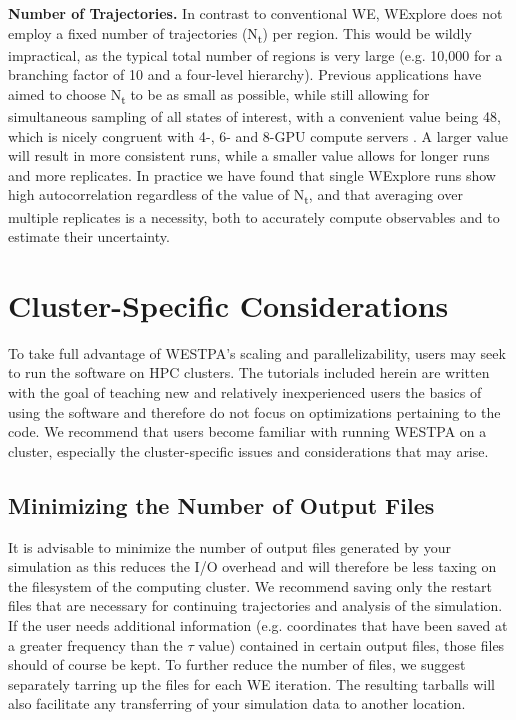 \documentclass[9pt,tutorial,ASAPversion]{livecoms}
\begin{document}
\textbf{Number of Trajectories.} In contrast to conventional WE, WExplore does not employ a fixed number of trajectories (N\textsubscript{t}) per region. 
This would be wildly impractical, as the typical total number of regions is very large (e.g. 10,000 for a branching factor of 10 and a four-level hierarchy). 
Previous applications have aimed to choose N\textsubscript{t} to be as small as possible, while still allowing for simultaneous sampling of all states of interest, with a convenient value being 48, which is nicely congruent with 4-, 6- and 8-GPU compute servers \citep{Dickson2017,Dixon2018,Lotz2018}. 
A larger value will result in more consistent runs, while a smaller value allows for longer runs and more replicates. 
In practice we have found that single WExplore runs show high autocorrelation regardless of the value of N\textsubscript{t}, and that averaging over multiple replicates is a necessity, both to accurately compute observables and to estimate their uncertainty.

\section{Cluster-Specific Considerations}

To take full advantage of WESTPA’s scaling and parallelizability, users may seek to run the software on HPC clusters.
The tutorials included herein are written with the goal of teaching new and relatively inexperienced users the basics of using the software and therefore do not focus on optimizations pertaining to the code. 
We recommend that users become familiar with running WESTPA on a cluster, especially the cluster-specific issues and considerations that may arise.

\subsection{Minimizing the Number of Output Files}

It is advisable to minimize the number of output files generated by your simulation as this reduces the I/O overhead and will therefore be less taxing on the filesystem of the computing cluster. 
We recommend saving only the restart files that are necessary for continuing trajectories and analysis of the simulation. 
If the user needs additional information (e.g. coordinates that have been saved at a greater frequency than the $\tau$ value) contained in certain output files, those files should of course be kept. 
To further reduce the number of files, we suggest separately tarring up the files for each WE iteration. 
The resulting tarballs will also facilitate any transferring of your simulation data to another location. 
\end{document}
